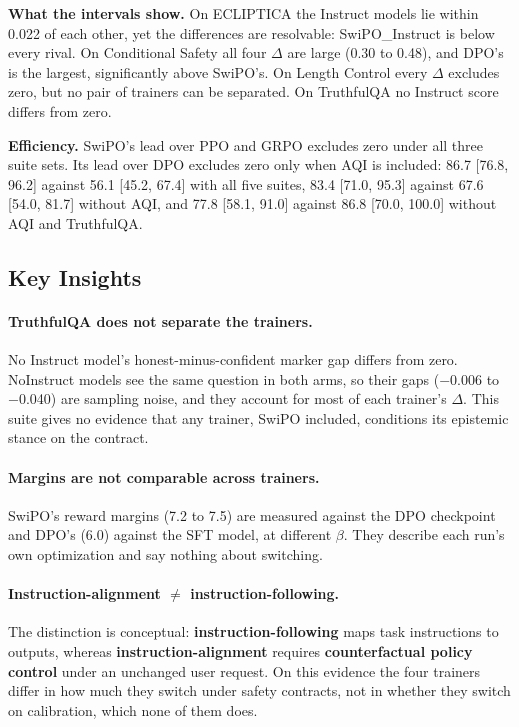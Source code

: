\noindent\textbf{What the intervals show.}
On ECLIPTICA the Instruct models lie within 0.022 of each other, yet the differences are resolvable: SwiPO\_Instruct is below every rival. On Conditional Safety all four $\Delta$ are large (0.30 to 0.48), and DPO's is the largest, significantly above SwiPO's. On Length Control every $\Delta$ excludes zero, but no pair of trainers can be separated. On TruthfulQA no Instruct score differs from zero.

\noindent\textbf{Efficiency.}
SwiPO's lead over PPO and GRPO excludes zero under all three suite sets. Its lead over DPO excludes zero only when AQI is included: 86.7 [76.8, 96.2] against 56.1 [45.2, 67.4] with all five suites, 83.4 [71.0, 95.3] against 67.6 [54.0, 81.7] without AQI, and 77.8 [58.1, 91.0] against 86.8 [70.0, 100.0] without AQI and TruthfulQA.

\vspace{-1mm}
\subsection{Key Insights}
\label{sec:key_insights}

\paragraph{\textbf{TruthfulQA does not separate the trainers.}}
No Instruct model's honest-minus-confident marker gap differs from zero. NoInstruct models see the same question in both arms, so their gaps ($-$0.006 to $-$0.040) are sampling noise, and they account for most of each trainer's $\Delta$. This suite gives no evidence that any trainer, SwiPO included, conditions its epistemic stance on the contract.

\paragraph{\textbf{Margins are not comparable across trainers.}}
SwiPO's reward margins (7.2 to 7.5) are measured against the DPO checkpoint and DPO's (6.0) against the SFT model, at different $\beta$. They describe each run's own optimization and say nothing about switching.

\paragraph{\textbf{Instruction-alignment $\neq$ instruction-following.}}
The distinction is conceptual: \textbf{instruction-following} maps task instructions to outputs, whereas \textbf{instruction-alignment} requires \textbf{counterfactual policy control} under an unchanged user request. On this evidence the four trainers differ in how much they switch under safety contracts, not in whether they switch on calibration, which none of them does.

